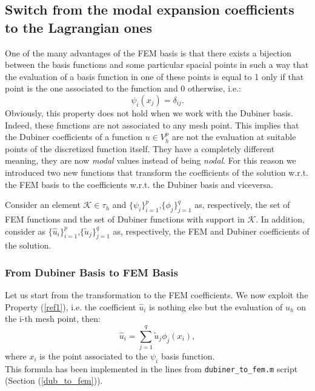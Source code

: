 \documentclass[a4paper,11pt]{article}
\begin{document}
\subsection{Switch from the modal expansion coefficients to the Lagrangian ones}
One of the many advantages of the FEM basis is that there exists a bijection between the basis functions and some particular spacial points in such a way that the evaluation of a basis function in one of these points is equal to 1 only if that point is the one associated to the function and 0 otherwise, i.e.:
	\begin{equation} \label{ref1}
	\psi_i(x_j)=\delta_{ij}.
	\end{equation}
	Obviously, this property does not hold when we work with the Dubiner basis. Indeed, these functions are not associated to any mesh point. This implies that the Dubiner coefficients of a function $u\in V_h^p$ are not the evaluation at suitable points of the discretized function itself. They have a completely different meaning, they are now \emph{modal} values instead of being \emph{nodal}.
	For this reason we introduced two new functions that transform the coefficients of the solution w.r.t. the FEM basis to the coefficients w.r.t. the Dubiner basis and viceversa.\vspace{5mm}
	
	\noindent Consider an element $\mathcal{K}\in \tau_h$ and $\{\psi_{i}\}_{i=1}^{p}$,$\{\phi_{j}\}_{j=1}^{q}$ as, respectively, the set of FEM functions and the set of Dubiner functions with support in $\mathcal{K}$. In addition, consider as $\{\hat{u}_i\}_{i=1}^p$,$\{\tilde{u}_j\}_{j=1}^q$ as, respectively, the FEM and Dubiner coefficients of the solution.
	
	\subsubsection{From Dubiner Basis to FEM Basis}
	\noindent Let us start from the transformation to the FEM coefficients. We now exploit the Property (\ref{ref1}), i.e. the coefficient $\hat{u}_i$ is nothing else but the evaluation of $u_h$ on the i-th mesh point, then: 
	\begin{equation} \label{ref3}
	\hat{u}_i = \sum_{j=1}^q \tilde{u}_j\phi_j(x_i),
	\end{equation}
	where $x_i$ is the point associated to the $\psi_i$ basis function. \\
	This formula has been implemented in the lines from \texttt{dubiner\_to\_fem.m} script (Section (\ref{dub_to_fem})).
\end{document}
